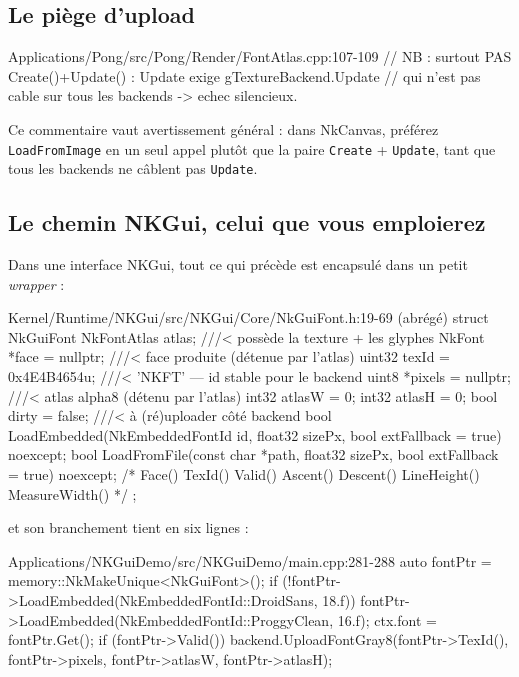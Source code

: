 \subsection{Le piège d'upload}

\begin{nkcode}{Applications/Pong/src/Pong/Render/FontAtlas.cpp:107-109}
            // NB : surtout PAS Create()+Update() : Update exige gTextureBackend.Update
            // qui n'est pas cable sur tous les backends -> echec silencieux.
\end{nkcode}

Ce commentaire vaut avertissement général : dans NkCanvas, préférez
\texttt{LoadFromImage} en un seul appel plutôt que la paire
\texttt{Create} + \texttt{Update}, tant que tous les backends ne câblent pas
\texttt{Update}.

\subsection{Le chemin NKGui, celui que vous emploierez}

Dans une interface NKGui, tout ce qui précède est encapsulé dans un petit
\emph{wrapper} :

\begin{nkcode}{Kernel/Runtime/NKGui/src/NKGui/Core/NkGuiFont.h:19-69 (abrégé)}
        struct NkGuiFont {
                NkFontAtlas atlas;            ///< possède la texture + les glyphes
                NkFont *face = nullptr;        ///< face produite (détenue par l'atlas)
                uint32 texId = 0x4E4B4654u; ///< 'NKFT' — id stable pour le backend
                uint8 *pixels = nullptr;    ///< atlas alpha8 (détenu par l'atlas)
                int32 atlasW = 0;
                int32 atlasH = 0;
                bool dirty = false; ///< à (ré)uploader côté backend
                bool LoadEmbedded(NkEmbeddedFontId id, float32 sizePx, bool extFallback = true) noexcept;
                bool LoadFromFile(const char *path, float32 sizePx, bool extFallback = true) noexcept;
                /* Face() TexId() Valid() Ascent() Descent() LineHeight() MeasureWidth() */
        };
\end{nkcode}

et son branchement tient en six lignes :

\begin{nkcode}{Applications/NKGuiDemo/src/NKGuiDemo/main.cpp:281-288}
    auto fontPtr = memory::NkMakeUnique<NkGuiFont>();
    if (!fontPtr->LoadEmbedded(NkEmbeddedFontId::DroidSans, 18.f)) {
        fontPtr->LoadEmbedded(NkEmbeddedFontId::ProggyClean, 16.f);
    }
    ctx.font = fontPtr.Get();
    if (fontPtr->Valid()) {
        backend.UploadFontGray8(fontPtr->TexId(), fontPtr->pixels, fontPtr->atlasW, fontPtr->atlasH);
    }
\end{nkcode}

